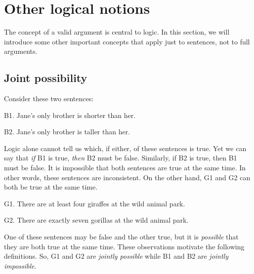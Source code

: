 \chapter{Other logical notions}\label{s:BasicNotions}

The concept of a valid argument is central to logic. In this section, we will introduce some other important concepts that apply just to sentences, not to full arguments. 


\section{Joint possibility}\label{s:joint-poss}

Consider these two sentences:
	\begin{ebullet}
		\item[B1.] Jane's only brother is shorter than her.
		\item[B2.] Jane's only brother is taller than her.
	\end{ebullet}
Logic alone cannot tell us which, if either, of these sentences is true. Yet we can say that \emph{if} B1 is true, \emph{then} B2 must be false. Similarly, if B2 is true, then B1 must be false. It is impossible that both sentences are true at the same time. In other words, these sentences are inconsistent. On the other hand, G1 and G2 can both be true at the same time.
	\begin{ebullet}	
		\item[G1.] \label{MartianGiraffes} There are at least four giraffes at the wild animal park.
		\item[G2.] There are exactly seven gorillas at the wild animal park.
	\end{ebullet}
One of these sentences may be false and the other true, but it  is \textit{possible} that they are both true at the same time. These observations motivate the following definitions.
\noindent So, G1 and G2 are \textit{jointly possible} while B1 and B2 are \emph{jointly impossible}.

